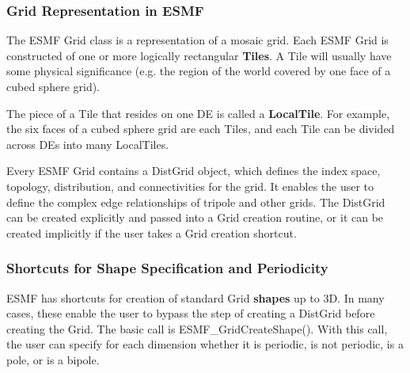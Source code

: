\subsubsection{Grid Representation in ESMF}

The ESMF Grid class is a representation of a mosaic grid.  Each ESMF
Grid is constructed of one or more logically rectangular {\bf Tiles}.
A Tile will usually have some physical significance (e.g. the region
of the world covered by one face of a cubed sphere grid).

The piece of a Tile that resides on one DE is called a {\bf LocalTile}.
For example, the six faces of a cubed sphere grid are each Tiles, and
each Tile can be divided across DEs into many LocalTiles. 

Every ESMF Grid contains a DistGrid object, which defines the index space,
topology, distribution, and connectivities for the grid.  It enables
the user to define the complex edge relationships of tripole and other
grids.  The DistGrid can be created explicitly and passed into a Grid
creation routine, or it can be created implicitly if the user takes
a Grid creation shortcut.

\subsubsection{Shortcuts for Shape Specification and Periodicity}
\label{sec:ShapeShortcut}
ESMF has shortcuts for creation of standard Grid {\bf shapes} up
to 3D.  In many cases, these enable the user to bypass the step of creating 
a DistGrid before creating the Grid.  The basic call is 
ESMF\_GridCreateShape().  With this call, the user can specify for
each dimension whether it is periodic, is not periodic, is a pole, or
is a bipole.

